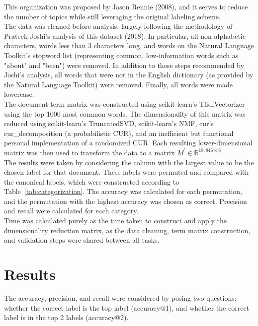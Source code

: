\documentclass{article}
\begin{document}
This organization was proposed by Jason Rennie (2008), and it serves to reduce the number of topics while still leveraging the original labeling scheme.\\

The data was cleaned before analysis, largely following the methodology of Prateek Joshi's analysis of this dataset (2018). In particular, all non-alphabetic characters, words less than 3 characters long, and words on the Natural Language Toolkit's stopword list (representing common, low-information words such as "about" and "been") were removed. In addition to these steps recommended by Joshi's analysis, all words that were not in the English dictionary (as provided by the Natural Language Toolkit) were removed.  Finally, all words were made lowercase.\\

The document-term matrix was constructed using scikit-learn's TfidfVectorizer using the top 1000 most common words. The dimensionality of this matrix was reduced using scikit-learn's TruncatedSVD, scikit-learn's NMF, cur's cur\_decomposition (a probabilistic CUR), and an inefficient but functional personal implementation of a randomized CUR. Each resulting lower-dimensional matrix was then used to transform the data to a matrix $M^{'} \in \mathbb{R}^{18,846 \times 6}$.\\

The results were taken by considering the column with the largest value to be the chosen label for that document. These labels were permuted and compared with the canonical labels, which were constructed according to Table~\ref{tab:categorization}. The accuracy was calculated for each permutation, and the permutation with the highest accuracy was chosen as correct. Precision and recall were calculated for each category.\\

Time was calculated purely as the time taken to construct and apply the dimensionality reduction matrix, as the data cleaning, term matrix construction, and validation steps were shared between all tasks.

\section{Results}
The accuracy, precision, and recall were considered by posing two questions: whether the correct label is the top label (accuracy@1), and whether the correct label is in the top 2 labels (accuracy@2).\\
\end{document}
